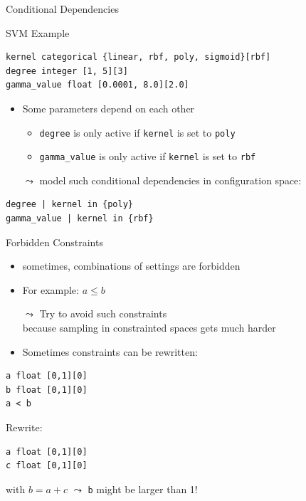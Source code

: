 \begin{frame}[c, fragile]{Conditional Dependencies}

\begin{block}{SVM Example}
\begin{verbatim}
kernel categorical {linear, rbf, poly, sigmoid}[rbf]
degree integer [1, 5][3]
gamma_value float [0.0001, 8.0][2.0]
\end{verbatim}
\end{block}

\pause

\begin{itemize}
  \item Some parameters depend on each other
  \begin{itemize}
    \item \texttt{degree} is only active if \texttt{kernel} is set to \texttt{poly}
    \item \texttt{gamma\_value} is only active if \texttt{kernel} is set to \texttt{rbf}  
  \end{itemize}
  \bigskip
  \pause
  \item[$\leadsto$] model such conditional dependencies in configuration space:
\end{itemize}

\begin{verbatim}
degree | kernel in {poly}
gamma_value | kernel in {rbf}
\end{verbatim}

\end{frame}
\begin{frame}[c, fragile]{Forbidden Constraints}

\begin{itemize}
  \item sometimes, combinations of settings are forbidden
  \item For example: $a \leq b$
  \smallskip
  \pause
  \item[$\leadsto$] Try to avoid such constraints\\ because sampling in constrainted spaces gets much harder
  \smallskip
  \item Sometimes constraints can be rewritten:
\end{itemize}

\begin{verbatim}
a float [0,1][0]
b float [0,1][0]
a < b
\end{verbatim}

Rewrite:
\begin{verbatim}
a float [0,1][0]
c float [0,1][0]
\end{verbatim}

with $b = a + c$ $\leadsto$ \texttt{b} might be larger than 1! 


\end{frame}
